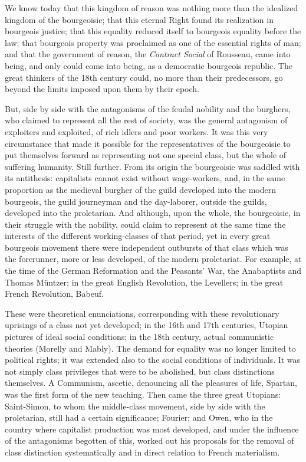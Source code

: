We know today that this kingdom of reason was nothing more than the idealized
kingdom of the bourgeoisie; that this eternal Right found its realization in
bourgeois justice; that this equality reduced itself to bourgeois equality
before the law; that bourgeois property was proclaimed as one of the essential
rights of man; and that the government of reason, the \emph{Contract Social} of
Rousseau, came into being, and only could come into being, as a democratic
bourgeois republic. The great thinkers of the 18th century could, no more than
their predecessors, go beyond the limits imposed upon them by their epoch.

But, side by side with the antagonisms of the feudal nobility and the burghers,
who claimed to represent all the rest of society, was the general antagonism of
exploiters and exploited, of rich idlers and poor workers. It was this very
circumstance that made it possible for the representatives of the bourgeoisie to
put themselves forward as representing not one special class, but the whole of
suffering humanity. Still further. From its origin the bourgeoisie was saddled
with its antithesis: capitalists cannot exist without wage-workers, and, in the
same proportion as the medieval burgher of the guild developed into the modern
bourgeois, the guild journeyman and the day-laborer, outside the guilds,
developed into the proletarian. And although, upon the whole, the bourgeoisie,
in their struggle with the nobility, could claim to represent at the same time
the interests of the different working-classes of that period, yet in every
great bourgeois movement there were independent outbursts of that class which
was the forerunner, more or less developed, of the modern proletariat. For
example, at the time of the German Reformation and the Peasants' War, the
Anabaptists and Thomas Müntzer; in the great English Revolution, the Levellers;
in the great French Revolution, Babeuf.

These were theoretical enunciations, corresponding with these revolutionary
uprisings of a class not yet developed; in the 16th and 17th centuries, Utopian
pictures of ideal social conditions; in the 18th century, actual communistic
theories (Morelly and Mably). The demand for equality was no longer limited to political rights; it was
extended also to the social conditions of individuals. It was not simply class
privileges that were to be abolished, but class distinctions themselves. A
Communism, ascetic, denouncing all the pleasures of life, Spartan, was the first
form of the new teaching. Then came the three great Utopians: Saint-Simon, to
whom the middle-class movement, side by side with the proletarian, still had a
certain significance; Fourier; and Owen, who in the country where capitalist
production was most developed, and under the influence of the antagonisms
begotten of this, worked out his proposals for the removal of class distinction
systematically and in direct relation to French materialism.

